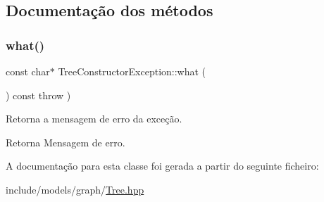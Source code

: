 \subsection{Documentação dos métodos}
\mbox{\label{classTreeConstructorException_acc8b569a2ad401614e1d8a9f6b0bd5d8}} 
\subsubsection{\texorpdfstring{what()}{what()}}
{\footnotesize\ttfamily const char$\ast$ Tree\+Constructor\+Exception\+::what (\begin{DoxyParamCaption}{ }\end{DoxyParamCaption}) const throw  ) \hspace{0.3cm}{\ttfamily [inline]}}

Retorna a mensagem de erro da exceção. \begin{DoxyReturn}{Retorna}
Mensagem de erro. 
\end{DoxyReturn}


A documentação para esta classe foi gerada a partir do seguinte ficheiro\+:\begin{DoxyCompactItemize}
\item 
include/models/graph/\hyperlink{Tree_8hpp}{Tree.\+hpp}\end{DoxyCompactItemize}
